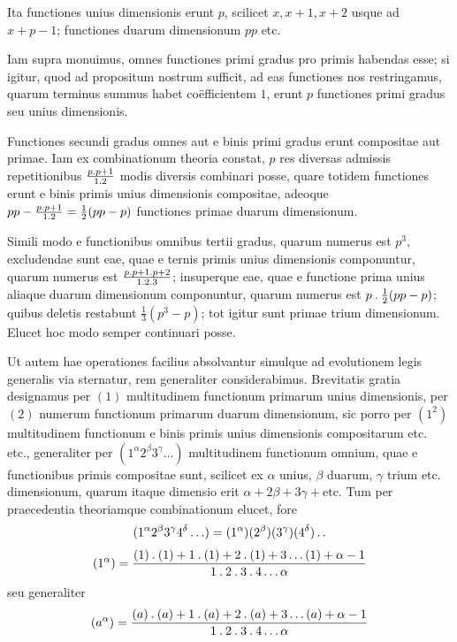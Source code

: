 Ita functiones unius dimensionis erunt $p$, scilicet $x,x+1,x+2$ usque ad $x+p-1$; functiones duarum dimensionum $pp$ etc.

Iam supra monuimus, omnes functiones primi gradus pro primis habendas esse; si igitur, quod ad propositum nostrum sufficit, ad eas functiones nos restringamus, quarum terminus summus habet coëfficientem $1$, erunt $p$ functiones primi gradus seu unius dimensionis.

Functiones secundi gradus omnes aut e binis primi gradus erunt compositae aut primae. Iam ex combinationum theoria constat, $p$ res diversas admissis repetitionibus $\frac{p\mathbin{.} p+1}{1\mathbin{.}2}$ modis diversis combinari posse, quare totidem functiones erunt e binis primis unius dimensionis compositae, adeoque $pp-\frac{p\mathbin{.} p+1}{1\mathbin{.}2}=\frac12(pp-p)$ functiones primae duarum dimensionum.

%
Simili modo e functionibus omnibus tertii gradus, quarum numerus est $p^3$, excludendae sunt eae, quae e ternis primis unius dimensionis componuntur, quarum numerus est $\frac{p\mathbin{.} p+1\mathbin{.} p+2}{1\mathbin{.}2\mathbin{.}3}$; insuperque eae, quae e functione prima unius aliaque duarum dimensionum componuntur, quarum numerus est $p\mathbin{.}\frac12(pp-p)$; quibus deletis restabunt $\frac13(p^3-p)$; tot igitur sunt primae trium dimensionum. Elucet hoc modo semper continuari posse.

Ut autem hae operationes facilius absolvantur simulque ad evolutionem legis generalis via sternatur, rem generaliter considerabimus. Brevitatis gratia designamus per $(1)$ multitudinem functionum primarum unius dimensionis, per $(2)$ numerum functionum primarum duarum dimensionum, sic porro per $(1^2)$ multitudinem functionum e binis primis unius dimensionis compositarum etc. etc., generaliter per $(1^\alpha2^\beta3^\gamma\ldots)$ multitudinem functionum omnium, quae e functionibus primis compositae sunt, scilicet ex $\alpha$ unius, $\beta$ duarum, $\gamma$ trium etc. dimensionum, quarum itaque dimensio erit $\alpha+2\beta+3\gamma+\text{etc.}$ Tum per praecedentia theoriamque combinationum elucet, fore
\[
(1^\alpha2^\beta3^\gamma4^\delta\ldots)=(1^\alpha)(2^\beta)(3^\gamma)(4^\delta)\mathinner{.\,.}
\]
\[
(1^\alpha)=\frac{(1)\mathbin{.}(1)+1\mathbin{.}(1)+2\mathbin{.}(1)+3\ldots(1)+\alpha-1}{1\mathbin{.}2\mathbin{.}3\mathbin{.}4\ldots\alpha}
\]
seu generaliter
\[
(a^\alpha)=\frac{(a)\mathbin{.}(a)+1\mathbin{.}(a)+2\mathbin{.}(a)+3\ldots(a)+\alpha-1}{1\mathbin{.}2\mathbin{.}3\mathbin{.}4\ldots\alpha}
\]

